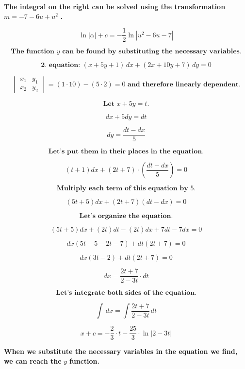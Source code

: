 \documentclass{article}
\begin{document}
    \textbf{The integral on the right can be solved using the transformation } $m = -7 - 6u + u^2$ \textbf{.}
    
    \[
    \ln|\alpha| + c = -\frac{1}{2} \ln|u^2 - 6u - 7|
    \]
    
    \[
    \textbf{The function } y \textbf{ can be found by substituting the necessary variables.}
    \]

    \[
    \textbf{2. equation: } \left(x + 5y + 1\right) \, dx + \left(2x + 10y + 7\right) \, dy = 0
    \]
    
    \[
    \begin{vmatrix}
        x_1 & y_1\\
        x_2 & y_2
    \end{vmatrix}
    =
    \left(1 \cdot 10\right) - \left(5 \cdot 2\right) = 0 \textbf{ and therefore linearly dependent.}
    \]

    \[
    \textbf{Let } x + 5y = t \textbf{.}
    \]

    \[
    dx + 5dy = dt
    \]

    \[
    dy = \frac{dt - dx}{5}
    \]

    \[
    \textbf{Let's put them in their places in the equation.}
    \]

    \[
    \left(t + 1\right)dx + \left(2t + 7\right) \cdot \left(\frac{dt - dx}{5}\right) = 0
    \]

    \[
    \textbf{Multiply each term of this equation by } 5 \textbf{.}
    \]

    \[
    \left(5t + 5\right)dx + \left(2t + 7\right)\left(dt - dx\right) = 0
    \]

    \[
    \textbf{Let's organize the equation.}
    \]

    \[
    \left(5t + 5\right)dx + \left(2t\right)dt - \left(2t\right)dx + 7dt - 7dx = 0
    \]

    \[
    dx\left(5t + 5 - 2t - 7\right) + dt\left(2t + 7\right) = 0
    \]
    
    \[
    dx\left(3t - 2\right) + dt\left(2t + 7\right) = 0
    \]

    \[
    dx = \frac{2t + 7}{2 - 3t} \cdot dt
    \]

    \[
    \textbf{Let's integrate both sides of the equation.}
    \]
    
    \[
    \int \, dx = \int \frac{2t + 7}{2 - 3t} \, dt
    \]

    \[
    x + c = -\frac{2}{3} \cdot t - \frac{25}{3} \cdot \ln\left|2 - 3t\right|
    \]

    \textbf{When we substitute the necessary variables in the equation we find, we can reach the } $y$ \textbf{ function.}
\\~\\
\end{document}
